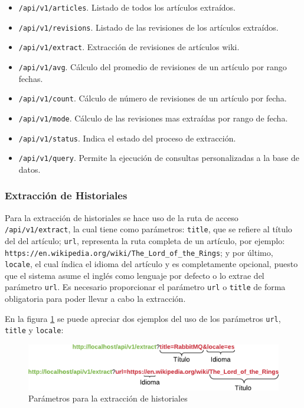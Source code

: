 \begin{itemize}
	\item \texttt{/api/v1/articles}. Listado de todos los artículos extraídos.
	\item \texttt{/api/v1/revisions}. Listado de las revisiones de los artículos extraídos.
	\item \texttt{/api/v1/extract}. Extracción de revisiones de artículos wiki.
	\item \texttt{/api/v1/avg}. Cálculo del promedio de revisiones de un artículo por rango fechas.
	\item \texttt{/api/v1/count}. Cálculo de número de revisiones de un artículo por fecha.
	\item \texttt{/api/v1/mode}. Cálculo de las revisiones mas extraídas por rango de fecha.
	\item \texttt{/api/v1/status}. Indica el estado del proceso de extracción.
	\item \texttt{/api/v1/query}. Permite la ejecución de consultas personalizadas a la base de datos.
\end{itemize}

\subsubsection{Extracción de Historiales}

Para la extracción de historiales se hace uso de la ruta de acceso \texttt{/api/v1/extract}, la cual
tiene como parámetros:
\texttt{title}, que se refiere al título del del artículo; \texttt{url}, representa la ruta completa de un artículo, por ejemplo:
\texttt{https://en.wikipedia.org/wiki/The\_Lord\_of\_the\_Rings}; y por último, \texttt{locale}, el cual índica el idioma del artículo y
es completamente opcional, puesto que el sistema asume el inglés como lenguaje por defecto o lo extrae del parámetro
\texttt{url}.
Es necesario proporcionar el parámetro \texttt{url} o \texttt{title} de forma obligatoria para poder llevar a cabo la extracción.

En la figura \ref{fig:extract_url_format} se puede apreciar dos ejemplos del uso de los parámetros \texttt{url}, \texttt{title} y \texttt{locale}:

\begin{figure}[H]
	\centering
		\includegraphics[width=1\textwidth]{figures/extract_url_format}
	\caption{Parámetros para la extracción de historiales}
	\label{fig:extract_url_format}
\end{figure}

